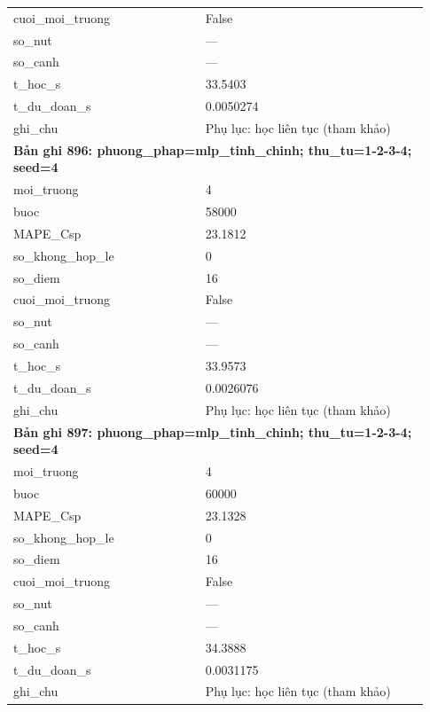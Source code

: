 \begin{longtable}{p{0.43\linewidth}p{0.50\linewidth}}
cuoi\_\allowbreak moi\_\allowbreak truong & False \\
so\_\allowbreak nut & — \\
so\_\allowbreak canh & — \\
t\_\allowbreak hoc\_\allowbreak s & 33.5403 \\
t\_\allowbreak du\_\allowbreak doan\_\allowbreak s & 0.0050274 \\
ghi\_\allowbreak chu & Phụ lục: học liên tục (tham khảo) \\
\midrule
\multicolumn{2}{p{0.95\linewidth}}{\textbf{Bản ghi 896: phuong\_phap=mlp\_tinh\_chinh; thu\_tu=1-2-3-4; seed=4}} \\
moi\_\allowbreak truong & 4 \\
buoc & 58000 \\
MAPE\_\allowbreak Csp & 23.1812 \\
so\_\allowbreak khong\_\allowbreak hop\_\allowbreak le & 0 \\
so\_\allowbreak diem & 16 \\
cuoi\_\allowbreak moi\_\allowbreak truong & False \\
so\_\allowbreak nut & — \\
so\_\allowbreak canh & — \\
t\_\allowbreak hoc\_\allowbreak s & 33.9573 \\
t\_\allowbreak du\_\allowbreak doan\_\allowbreak s & 0.0026076 \\
ghi\_\allowbreak chu & Phụ lục: học liên tục (tham khảo) \\
\midrule
\multicolumn{2}{p{0.95\linewidth}}{\textbf{Bản ghi 897: phuong\_phap=mlp\_tinh\_chinh; thu\_tu=1-2-3-4; seed=4}} \\
moi\_\allowbreak truong & 4 \\
buoc & 60000 \\
MAPE\_\allowbreak Csp & 23.1328 \\
so\_\allowbreak khong\_\allowbreak hop\_\allowbreak le & 0 \\
so\_\allowbreak diem & 16 \\
cuoi\_\allowbreak moi\_\allowbreak truong & False \\
so\_\allowbreak nut & — \\
so\_\allowbreak canh & — \\
t\_\allowbreak hoc\_\allowbreak s & 34.3888 \\
t\_\allowbreak du\_\allowbreak doan\_\allowbreak s & 0.0031175 \\
ghi\_\allowbreak chu & Phụ lục: học liên tục (tham khảo) \\

\end{longtable}
